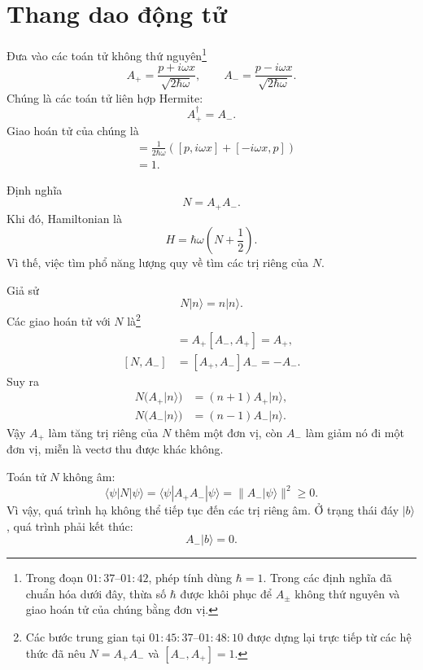 \section{Thang dao động tử}

Đưa vào các toán tử không thứ nguyên\footnote{Trong đoạn \(01{:}37\)--\(01{:}42\), phép tính dùng \(\hbar=1\). Trong các định nghĩa đã chuẩn hóa dưới đây, thừa số \(\hbar\) được khôi phục để \(A_\pm\) không thứ nguyên và giao hoán tử của chúng bằng đơn vị.}
\begin{equation}
A_+=\frac{p+i\omega x}{\sqrt{2\hbar\omega}},
\qquad
A_-=\frac{p-i\omega x}{\sqrt{2\hbar\omega}}.
\end{equation}
Chúng là các toán tử liên hợp Hermite:
\begin{equation}
A_+^\dagger=A_-.
\end{equation}
Giao hoán tử của chúng là
\begin{align}
[A_-,A_+]
&=\frac{1}{2\hbar\omega}
\left([p,i\omega x]+[-i\omega x,p]\right) \\
&=1.
\end{align}

Định nghĩa
\begin{equation}
N=A_+A_-.
\end{equation}
Khi đó, Hamiltonian là
\begin{equation}
H=\hbar\omega\left(N+\frac{1}{2}\right).
\end{equation}
Vì thế, việc tìm phổ năng lượng quy về tìm các trị riêng của \(N\).

Giả sử
\begin{equation}
N|n\rangle=n|n\rangle.
\end{equation}
Các giao hoán tử với \(N\) là\footnote{Các bước trung gian tại \(01{:}45{:}37\)--\(01{:}48{:}10\) được dựng lại trực tiếp từ các hệ thức đã nêu \(N=A_+A_-\) và \([A_-,A_+]=1\).}
\begin{align}
[N,A_+]
&=A_+[A_-,A_+]=A_+, \\
[N,A_-]
&=[A_+,A_-]A_-=-A_-.
\end{align}
Suy ra
\begin{align}
N\bigl(A_+|n\rangle\bigr)
&=(n+1)A_+|n\rangle, \\
N\bigl(A_-|n\rangle\bigr)
&=(n-1)A_-|n\rangle.
\end{align}
Vậy \(A_+\) làm tăng trị riêng của \(N\) thêm một đơn vị, còn \(A_-\) làm giảm nó đi một đơn vị, miễn là vectơ thu được khác không.

Toán tử \(N\) không âm:
\begin{equation}
\langle\psi|N|\psi\rangle
=\langle\psi|A_+A_-|\psi\rangle
=\|A_-|\psi\rangle\|^2
\geq0.
\end{equation}
Vì vậy, quá trình hạ không thể tiếp tục đến các trị riêng âm. Ở trạng thái đáy \(|b\rangle\), quá trình phải kết thúc:
\begin{equation}
A_-|b\rangle=0.
\end{equation}

